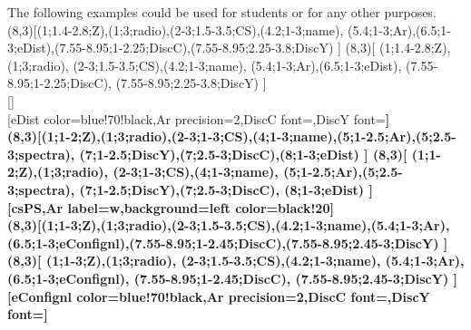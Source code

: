 The following examples could be used for students or for any other purposes.
\\ [10pt]\pgfPTMbuildcell(8,3)[(1;1.4-2.8;Z),(1;3;radio),(2-3;1.5-3.5;CS),(4.2;1-3;name), %
(5.4;1-3;Ar),(6.5;1-3;eDist),(7.55-8.95;1-2.25;DiscC),(7.55-8.95;2.25-3.8;DiscY)%
]%
\pgfPTbuildcell(8,3)[%
(1;1.4-2.8;Z),(1;3;radio),%
(2-3;1.5-3.5;CS),(4.2;1-3;name),%
(5.4;1-3;Ar),(6.5;1-3;eDist),%
(7.55-8.95;1-2.25;DiscC),%
(7.55-8.95;2.25-3.8;DiscY)%
]%
\\ [-4pt][]%
\\ [10pt]\makebox[\linewidth][c]{\scalebox{.6}{\pgfPT}}%
\vfill%
[eDist color=blue!70!black,Ar precision=2,DiscC font=\string\fontsize{4}{4}\string\selectfont,DiscY font=\string\fontsize{4}{4}\string\selectfont\string\bfseries]
\\ [10pt]\makebox[\linewidth][c]{\scalebox{.6}{\pgfPT[eDist color=blue!70!black,Ar precision=2,DiscC font=\fontsize{4}{4}\selectfont,DiscY font=\fontsize{4}{4}\selectfont\bfseries]}}%
\newpage%
\pgfPTMbuildcell(8,3)[(1;1-2;Z),(1;3;radio),(2-3;1-3;CS),(4;1-3;name),(5;1-2.5;Ar),(5;2.5-3;spectra), %
(7;1-2.5;DiscY),(7;2.5-3;DiscC),(8;1-3;eDist)%
]%
\pgfPTbuildcell(8,3)[%
(1;1-2;Z),(1;3;radio),%
(2-3;1-3;CS),(4;1-3;name),%
(5;1-2.5;Ar),(5;2.5-3;spectra),%
(7;1-2.5;DiscY),(7;2.5-3;DiscC),%
(8;1-3;eDist)%
]%
\\ [-4pt][csPS,Ar label=w,background={left color=black!20}]%
\\ [10pt]\makebox[\linewidth][c]{\scalebox{.6}{\pgfPT[csPS,Ar label=w,background={left color=black!20}]}}%
\vfill%
\pgfPTMbuildcell(8,3)[(1;1-3;Z),(1;3;radio),(2-3;1.5-3.5;CS),(4.2;1-3;name),(5.4;1-3;Ar), %
(6.5;1-3;eConfignl),(7.55-8.95;1-2.45;DiscC),(7.55-8.95;2.45-3;DiscY)%
]%
\pgfPTbuildcell(8,3)[%
(1;1-3;Z),(1;3;radio),%
(2-3;1.5-3.5;CS),(4.2;1-3;name),%
(5.4;1-3;Ar),%
(6.5;1-3;eConfignl),%
(7.55-8.95;1-2.45;DiscC),%
(7.55-8.95;2.45-3;DiscY)%
]%
\\ [-4pt][eConfignl color=blue!70!black,Ar precision=2,DiscC font=\string\fontsize{4}{4}\string\selectfont,DiscY font=\string\fontsize{4}{4}\string\selectfont\string\bfseries]%
\\ [10pt]\makebox[\linewidth][c]{\scalebox{.6}{\pgfPT[eConfignl color=blue!70!black,Ar precision=2,DiscC font=\fontsize{4}{4}\selectfont,DiscY font=\fontsize{4}{4}\selectfont\bfseries]}}%
\newpage%
\pgfPTresetcell%
